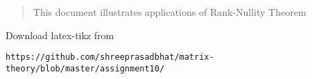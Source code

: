 \documentclass[journal,12pt,twocolumn]{IEEEtran}
\begin{document}
% 
\maketitle
\newpage
\bigskip
\renewcommand{\thefigure}{\theenumi}
\renewcommand{\thetable}{\theenumi}

%
%
\begin{abstract}
This document illustrates applications of Rank-Nullity Theorem
\end{abstract}
Download latex-tikz from
\begin{lstlisting}
https://github.com/shreeprasadbhat/matrix-theory/blob/master/assignment10/
\end{lstlisting}
%
\end{document}
